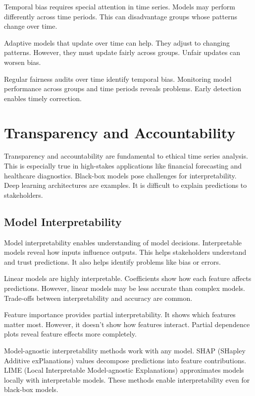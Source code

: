 Temporal bias requires special attention in time series. Models may perform differently across time periods. This can disadvantage groups whose patterns change over time.

Adaptive models that update over time can help. They adjust to changing patterns. However, they must update fairly across groups. Unfair updates can worsen bias.

Regular fairness audits over time identify temporal bias. Monitoring model performance across groups and time periods reveals problems. Early detection enables timely correction.

\section{Transparency and Accountability}

Transparency and accountability are fundamental to ethical time series analysis. This is especially true in high-stakes applications like financial forecasting and healthcare diagnostics. Black-box models pose challenges for interpretability. Deep learning architectures are examples. It is difficult to explain predictions to stakeholders.

\subsection{Model Interpretability}

Model interpretability enables understanding of model decisions. Interpretable models reveal how inputs influence outputs. This helps stakeholders understand and trust predictions. It also helps identify problems like bias or errors.

Linear models are highly interpretable. Coefficients show how each feature affects predictions. However, linear models may be less accurate than complex models. Trade-offs between interpretability and accuracy are common.

Feature importance provides partial interpretability. It shows which features matter most. However, it doesn't show how features interact. Partial dependence plots reveal feature effects more completely.

Model-agnostic interpretability methods work with any model. SHAP (SHapley Additive exPlanations) values decompose predictions into feature contributions. LIME (Local Interpretable Model-agnostic Explanations) approximates models locally with interpretable models. These methods enable interpretability even for black-box models.

